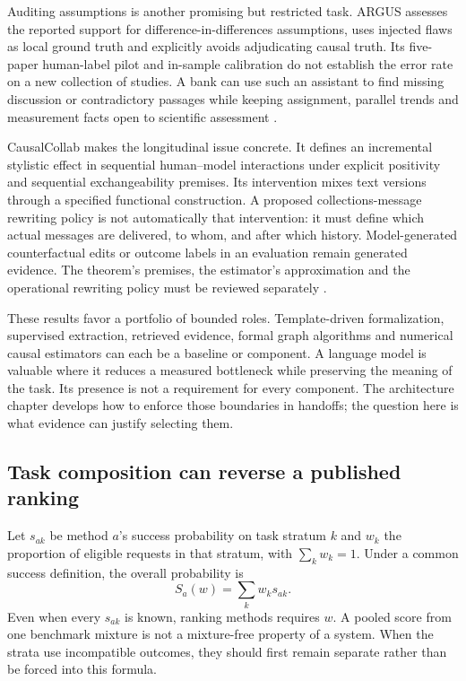 Auditing assumptions is another promising but restricted task. ARGUS assesses
the reported support for difference-in-differences assumptions, uses injected
flaws as local ground truth and explicitly avoids adjudicating causal truth.
Its five-paper human-label pilot and in-sample calibration do not establish
the error rate on a new collection of studies. A bank can use such an assistant
to find missing discussion or contradictory passages while keeping assignment,
parallel trends and measurement facts open to scientific assessment
\citep{v12_la_2609_30867}.

CausalCollab makes the longitudinal issue concrete. It defines an incremental
stylistic effect in sequential human--model interactions under explicit
positivity and sequential exchangeability premises. Its intervention mixes
text versions through a specified functional construction. A proposed
collections-message rewriting policy is not automatically that intervention:
it must define which actual messages are delivered, to whom, and after which
history. Model-generated counterfactual edits or outcome labels in an
evaluation remain generated evidence. The theorem's premises, the estimator's
approximation and the operational rewriting policy must be reviewed separately
\citep{exec13_census_collaboration}.

These results favor a portfolio of bounded roles. Template-driven formalization,
supervised extraction, retrieved evidence, formal graph algorithms and numerical
causal estimators can each be a baseline or component. A language model is
valuable where it reduces a measured bottleneck while preserving the meaning
of the task. Its presence is not a requirement for every component. The
architecture chapter develops how to enforce those boundaries in handoffs;
the question here is what evidence can justify selecting them.

\subsection{Task composition can reverse a published ranking}

Let $s_{ak}$ be method $a$'s success probability on task stratum $k$ and $w_k$
the proportion of eligible requests in that stratum, with $\sum_k w_k=1$.
Under a common success definition, the overall probability is
\begin{equation}
 S_a(w)=\sum_k w_k s_{ak}.
 \label{exec13:frontier-mixture}
\end{equation}
Even when every $s_{ak}$ is known, ranking methods requires $w$. A pooled score
from one benchmark mixture is not a mixture-free property of a system. When
the strata use incompatible outcomes, they should first remain separate rather
than be forced into this formula.

